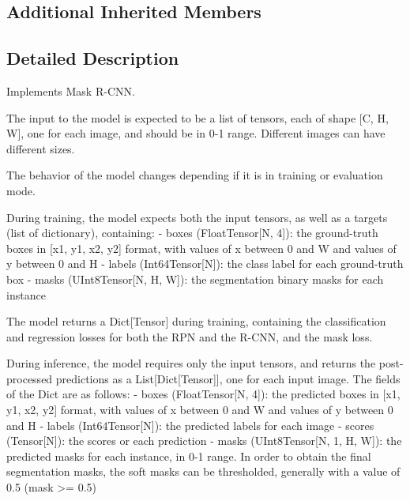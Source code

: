 \subsection*{Additional Inherited Members}


\subsection{Detailed Description}
\begin{DoxyVerb}Implements Mask R-CNN.

The input to the model is expected to be a list of tensors, each of shape [C, H, W], one for each
image, and should be in 0-1 range. Different images can have different sizes.

The behavior of the model changes depending if it is in training or evaluation mode.

During training, the model expects both the input tensors, as well as a targets (list of dictionary),
containing:
    - boxes (FloatTensor[N, 4]): the ground-truth boxes in [x1, y1, x2, y2] format, with values of x
      between 0 and W and values of y between 0 and H
    - labels (Int64Tensor[N]): the class label for each ground-truth box
    - masks (UInt8Tensor[N, H, W]): the segmentation binary masks for each instance

The model returns a Dict[Tensor] during training, containing the classification and regression
losses for both the RPN and the R-CNN, and the mask loss.

During inference, the model requires only the input tensors, and returns the post-processed
predictions as a List[Dict[Tensor]], one for each input image. The fields of the Dict are as
follows:
    - boxes (FloatTensor[N, 4]): the predicted boxes in [x1, y1, x2, y2] format, with values of x
      between 0 and W and values of y between 0 and H
    - labels (Int64Tensor[N]): the predicted labels for each image
    - scores (Tensor[N]): the scores or each prediction
    - masks (UInt8Tensor[N, 1, H, W]): the predicted masks for each instance, in 0-1 range. In order to
      obtain the final segmentation masks, the soft masks can be thresholded, generally
      with a value of 0.5 (mask >= 0.5)


\end{DoxyVerb}
